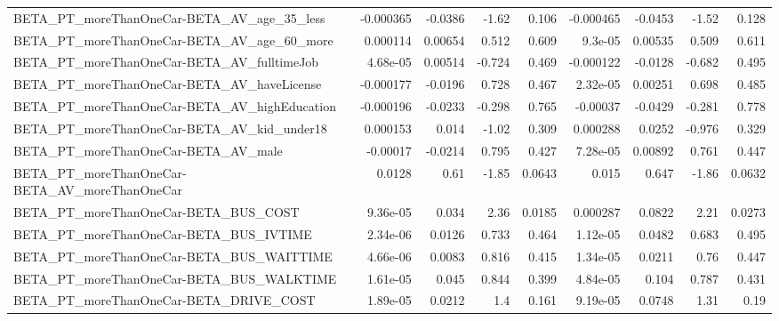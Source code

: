\begin{tabular}{lrrrrrrrr}
BETA\_PT\_moreThanOneCar-BETA\_AV\_age\_35\_less         &   -0.000365 &      -0.0386 &     -1.62 &    0.106 &  -0.000465 &     -0.0453 &        -1.52 &         0.128 \\
BETA\_PT\_moreThanOneCar-BETA\_AV\_age\_60\_more         &    0.000114 &      0.00654 &     0.512 &    0.609 &    9.3e-05 &     0.00535 &        0.509 &         0.611 \\
BETA\_PT\_moreThanOneCar-BETA\_AV\_fulltimeJob         &    4.68e-05 &      0.00514 &    -0.724 &    0.469 &  -0.000122 &     -0.0128 &       -0.682 &         0.495 \\
BETA\_PT\_moreThanOneCar-BETA\_AV\_haveLicense         &   -0.000177 &      -0.0196 &     0.728 &    0.467 &   2.32e-05 &     0.00251 &        0.698 &         0.485 \\
BETA\_PT\_moreThanOneCar-BETA\_AV\_highEducation       &   -0.000196 &      -0.0233 &    -0.298 &    0.765 &   -0.00037 &     -0.0429 &       -0.281 &         0.778 \\
BETA\_PT\_moreThanOneCar-BETA\_AV\_kid\_under18         &    0.000153 &        0.014 &     -1.02 &    0.309 &   0.000288 &      0.0252 &       -0.976 &         0.329 \\
BETA\_PT\_moreThanOneCar-BETA\_AV\_male                &    -0.00017 &      -0.0214 &     0.795 &    0.427 &   7.28e-05 &     0.00892 &        0.761 &         0.447 \\
BETA\_PT\_moreThanOneCar-BETA\_AV\_moreThanOneCar      &      0.0128 &         0.61 &     -1.85 &   0.0643 &      0.015 &       0.647 &        -1.86 &        0.0632 \\
BETA\_PT\_moreThanOneCar-BETA\_BUS\_COST               &    9.36e-05 &        0.034 &      2.36 &   0.0185 &   0.000287 &      0.0822 &         2.21 &        0.0273 \\
BETA\_PT\_moreThanOneCar-BETA\_BUS\_IVTIME             &    2.34e-06 &       0.0126 &     0.733 &    0.464 &   1.12e-05 &      0.0482 &        0.683 &         0.495 \\
BETA\_PT\_moreThanOneCar-BETA\_BUS\_WAITTIME           &    4.66e-06 &       0.0083 &     0.816 &    0.415 &   1.34e-05 &      0.0211 &         0.76 &         0.447 \\
BETA\_PT\_moreThanOneCar-BETA\_BUS\_WALKTIME           &    1.61e-05 &        0.045 &     0.844 &    0.399 &   4.84e-05 &       0.104 &        0.787 &         0.431 \\
BETA\_PT\_moreThanOneCar-BETA\_DRIVE\_COST             &    1.89e-05 &       0.0212 &       1.4 &    0.161 &   9.19e-05 &      0.0748 &         1.31 &          0.19 \\

\end{tabular}
